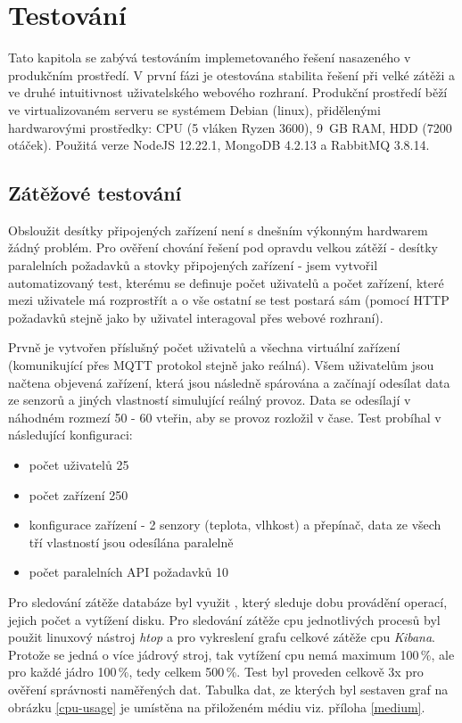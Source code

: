 \chapter{Testování}
Tato kapitola se zabývá testováním implemetovaného řešení nasazeného v produkčním prostředí. V první fázi je otestována stabilita řešení při velké zátěži a ve druhé intuitivnost uživatelského webového rozhraní. Produkční prostředí běží ve virtualizovaném serveru se systémem Debian (linux), přidělenými hardwarovými prostředky: CPU (5 vláken Ryzen 3600), 9~GB RAM, HDD (7200 otáček). Použitá verze NodeJS 12.22.1, MongoDB 4.2.13 a RabbitMQ 3.8.14.

\section{Zátěžové testování}
Obsloužit desítky připojených zařízení není s dnešním výkonným hardwarem žádný problém. Pro ověření chování řešení pod opravdu velkou zátěží - desítky paralelních požadavků a stovky připojených zařízení - jsem vytvořil automatizovaný test, kterému se definuje počet uživatelů a počet zařízení, které mezi uživatele má rozprostřít a o vše ostatní se test postará sám (pomocí HTTP požadavků stejně jako by uživatel interagoval přes webové rozhraní).

Prvně je vytvořen příslušný počet uživatelů a všechna virtuální zařízení (komunikující přes MQTT protokol stejně jako reálná). Všem uživatelům jsou načtena objevená zařízení, která jsou následně spárována a začínají odesílat data ze senzorů a jiných vlastností simulující reálný provoz. Data se odesílají v náhodném rozmezí 50 - 60 vteřin, aby se provoz rozložil v čase. Test probíhal v následující konfiguraci:
\begin{itemize}
    \item počet uživatelů 25
    \item počet zařízení 250
    \item konfigurace zařízení - 2 senzory (teplota, vlhkost) a přepínač, data ze všech tří vlastností jsou odesílána paralelně
    \item počet paralelních API požadavků 10
\end{itemize}
Pro sledování zátěže databáze byl využit  \cite{free-monitoring}, který sleduje dobu provádění operací, jejich počet a vytížení disku. Pro sledování zátěže cpu jednotlivých procesů byl použit linuxový nástroj \textit{htop} a pro vykreslení grafu celkové zátěže cpu \textit{Kibana}. Protože se jedná o více jádrový stroj, tak vytížení cpu nemá maximum 100\,\%, ale pro každé jádro 100\,\%, tedy celkem 500\,\%. Test byl proveden celkově 3x pro ověření správnosti naměřených dat. Tabulka dat, ze kterých byl sestaven graf na obrázku \ref{cpu-usage} je umístěna na přiloženém médiu viz. příloha \ref{medium}.


